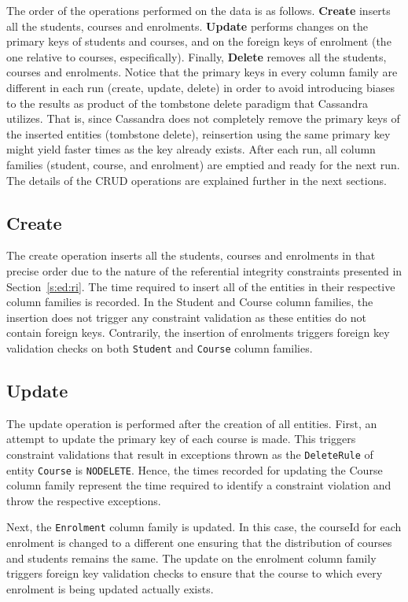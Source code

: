 The order of the operations performed on the data is as follows. \textbf{Create}
inserts all the students, courses and enrolments. \textbf{Update} performs
changes on the primary keys of students and courses, and on the foreign keys
of enrolment (the one relative to courses, especifically). Finally,
\textbf{Delete} removes all the students, courses and enrolments.  Notice that
the primary keys in every column family  are different in each run (create,
update, delete) in order to avoid  introducing biases to the results as product
of the tombstone delete paradigm  that Cassandra utilizes. That is, since
Cassandra does not completely  remove the primary keys of the inserted entities
(tombstone delete), reinsertion  using the same primary key might yield faster
times as the key already exists. After  each run, all column families (student,
course, and enrolment) are emptied and  ready for the next run.  The details  of
the \ac{CRUD} operations are explained further in the next sections.
		

	
\subsection{Create} The create operation inserts all the students, courses and
enrolments in that precise order due to the nature of the referential integrity
constraints presented in Section~\ref{s:ed:ri}. The time required to insert all
of the entities in their respective column families  is recorded. In the Student
and Course column families, the insertion does not trigger any constraint
validation as these entities do not contain foreign keys. Contrarily, the
insertion of enrolments triggers foreign key validation checks on both
\texttt{Student} and \texttt{Course} column families.
		
\subsection{Update} The update operation is performed after the creation of all
entities.
First, an attempt to update the primary key of each course is made. This
triggers constraint validations that result in exceptions thrown as the
\texttt{DeleteRule} of entity \texttt{Course} is \texttt{NODELETE}. Hence, the
times recorded for updating the Course column family represent the time required
to identify a constraint violation and throw the respective exceptions.
					
Next, the \texttt{Enrolment} column family is updated. In this case, the
courseId for each enrolment is changed to a different one ensuring that the
distribution of courses and students remains the same. The update on the
enrolment column family triggers foreign key validation checks to ensure that
the course to which every enrolment is being updated actually exists.
					

